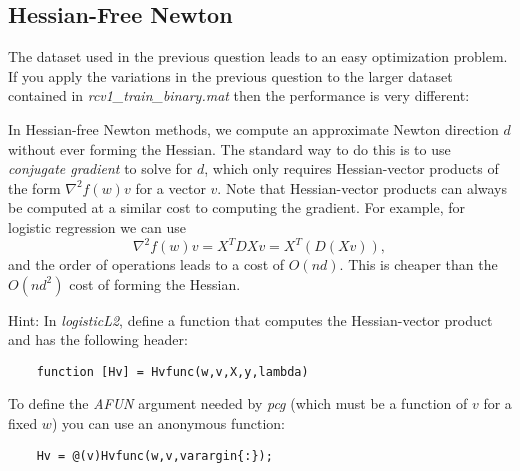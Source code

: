 \documentclass{article}
\begin{document}
\subsection{Hessian-Free Newton}

The dataset used in the previous question leads to an easy optimization problem. If you apply the variations in the previous question to the larger dataset contained in \emph{rcv1\_train\_binary.mat} then the performance is very different:

\setcounter{enumi}{-1}
In Hessian-free Newton methods, we compute an approximate Newton direction $d$ without ever forming the Hessian. The standard way to do this is to use \emph{conjugate gradient} to solve for $d$, which only requires Hessian-vector products of the form $\nabla^2 f(w)v$ for a vector $v$. Note that Hessian-vector products can always be computed at a similar cost to computing the gradient. For example, for logistic regression we can use
\[
\nabla^2 f(w)v = X^TDXv = X^T(D(Xv)),
\]
and the order of operations leads to a cost of $O(nd)$. This is cheaper than the $O(nd^2)$ cost of forming the Hessian. 

Hint: In \emph{logisticL2}, define a function that computes the Hessian-vector product and has the following header:
\begin{verbatim}
	function [Hv] = Hvfunc(w,v,X,y,lambda)
\end{verbatim}
To define the \emph{AFUN} argument needed by \emph{pcg} (which must be a function of $v$ for a fixed $w$)  you can use an anonymous function:
\begin{verbatim}
	Hv = @(v)Hvfunc(w,v,varargin{:});
\end{verbatim}
\end{document}
